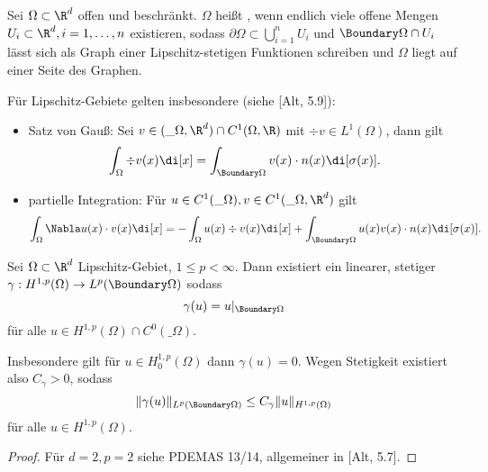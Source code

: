 
\begin{df}
	Sei $\Omega \subset \R^d$ offen und beschränkt.
	$\Omega$ heißt , wenn endlich viele offene Mengen $U_i \subset \R^d, i = 1, \dotsc, n$ existieren, sodass $\partial \Omega \subset \bigcup_{i=1}^n U_i$ und $\Boundary \Omega \cap U_i$ lässt sich als Graph einer Lipschitz-stetigen Funktionen schreiben und $\Omega$ liegt auf einer Seite des Graphen.
	\begin{note}
		Für Lipschitz-Gebiete gelten insbesondere (siehe [Alt, 5.9]):
		\begin{itemize}
			\item
				Satz von Gauß:
				Sei $v \in (\_\Omega, \R^d) \cap C^1(\Omega, \R)$ mit $\div v \in L^1(\Omega)$, dann gilt
				\[
					\int_\Omega \div v(x) \di[x]
					= \int_{\Boundary \Omega} v(x) \cdot n(x) \di[\sigma(x)].
				\]
			\item
				partielle Integration:
				Für $u \in C^1(\_\Omega), v \in C^1(\_\Omega, \R^d)$ gilt
				\[
					\int_\Omega \Nabla u(x) \cdot v(x) \di[x]
					= - \int_\Omega u(x) \div v(x) \di[x] + \int_{\Boundary \Omega} u(x) v(x) \cdot n(x) \di[\sigma(x)].
				\]
		\end{itemize}
	\end{note}
\end{df}

\begin{st}[Spursatz] \label{3.10}
	Sei $\Omega \subset \R^d$ Lipschitz-Gebiet, $1 \le p < \infty$.
	Dann existiert ein linearer, stetiger  $\gamma: H^{1,p}(\Omega) \to L^p(\Boundary \Omega)$ sodass
	\[
		\gamma(u) = u|_{\Boundary \Omega}
	\]
	für alle $u \in H^{1,p}(\Omega) \cap C^0(\_\Omega)$.

	Insbesondere gilt für $u \in H_0^{1,p}(\Omega)$ dann $\gamma(u) = 0$.
	Wegen Stetigkeit existiert also $C_\gamma > 0$, sodass
	\[
		\|\gamma(u)\|_{L^p(\Boundary \Omega)} \le C_\gamma \|u\|_{H^{1,p}(\Omega)}
	\]
	für alle $u \in H^{1,p}(\Omega)$.
	\begin{proof}
		Für $d = 2, p = 2$ siehe PDEMAS 13/14, allgemeiner in [Alt, 5.7].
	\end{proof}
\end{st}

